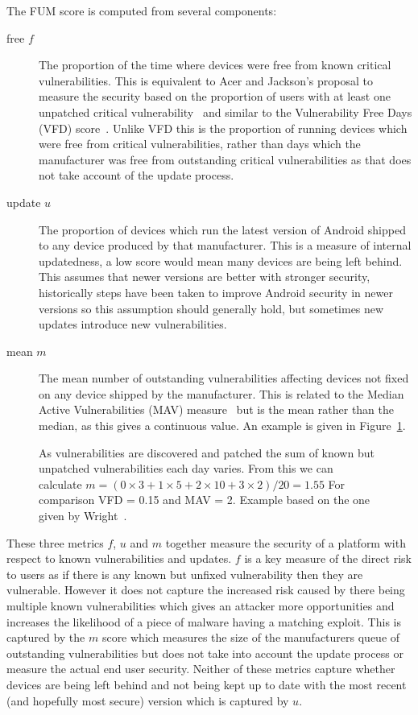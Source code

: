 The FUM score is computed from several components:
\begin{description}
  \item[free $f$] The proportion of the time where devices were free from known critical vulnerabilities. This is equivalent to Acer and Jackson's proposal to measure the security based on the proportion of users with at least one unpatched critical vulnerability~\cite{Acer2010} and similar to the Vulnerability Free Days (VFD) score~\cite{Wright2014}.
  Unlike VFD this is the proportion of running devices which were free from critical vulnerabilities, rather than days which the manufacturer was free from outstanding critical vulnerabilities as that does not take account of the update process.
  \item[update $u$] The proportion of devices which run the latest version of Android shipped to any device produced by that manufacturer. This is a measure of internal updatedness, a low score would mean many devices are being left behind.
  This assumes that newer versions are better with stronger security, historically steps have been taken to improve Android security in newer versions so this assumption should generally hold, but sometimes new updates introduce new vulnerabilities.
  \item[mean $m$] The mean number of outstanding vulnerabilities affecting devices not fixed on any device shipped by the manufacturer. This is related to the Median Active Vulnerabilities (MAV) measure~\cite{Wright2014} but is the mean rather than the median, as this gives a continuous value.
  An example is given in Figure~\ref{fig:mcalculation}.
\end{description}

\begin{figure}
\centering

\caption{As vulnerabilities are discovered and patched the sum of known but unpatched vulnerabilities each day varies. From this we can calculate $m = (0 \times 3 + 1 \times 5 + 2 \times 10 + 3 \times 2) / 20 = 1.55$ For comparison VFD = 0.15 and MAV = 2. Example based on the one given by Wright~\cite{Wright2014}.}
\label{fig:mcalculation}
\end{figure}

These three metrics $f$, $u$ and $m$ together measure the security of a platform with respect to known vulnerabilities and updates.
$f$ is a key measure of the direct risk to users as if there is any known but unfixed vulnerability then they are vulnerable.
However it does not capture the increased risk caused by there being multiple known vulnerabilities which gives an attacker more opportunities and increases the likelihood of a piece of malware having a matching exploit.
This is captured by the $m$ score which measures the size of the manufacturers queue of outstanding vulnerabilities but does not take into account the update process or measure the actual end user security.
Neither of these metrics capture whether devices are being left behind and not being kept up to date with the most recent (and hopefully most secure) version which is captured by $u$.

